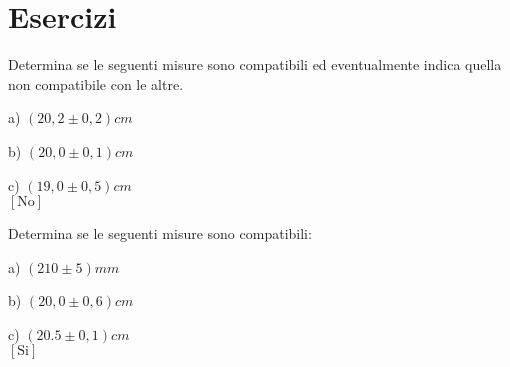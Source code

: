 \section{Esercizi}
 
\begin{esercizio}
Determina se le seguenti misure sono compatibili ed eventualmente indica quella non compatibile con le altre.
\begin{multicols}{3}
\begin{elenco}
 \item[a)] $\left(20,2 \pm 0,2\right)\si{cm}$\\
 \item[b)] $\left(20,0 \pm 0,1\right)\si{cm}$\\
 \item[c)] $\left(19,0 \pm 0,5\right)\si{cm}$ \\
 \hspace*{\fill}$\left[\text{No}\right]$
\end{elenco}
\end{multicols}

\end{esercizio} 
 
\begin{esercizio}
Determina se le seguenti misure sono compatibili:
\begin{multicols}{3}
\begin{elenco}
 \item[a)] $\left(210 \pm 5\right)\si{mm}$
 \item[b)] $\left(20,0 \pm 0,6\right)\si{cm}$
 \item[c)] $\left(20.5 \pm 0,1\right)\si{cm}$ \\
 \hspace*{\fill}  $\left[\text{Si}\right]$
\end{elenco}
\end{multicols}

\end{esercizio}   
 
 
 


 
